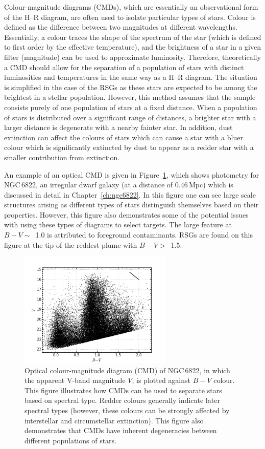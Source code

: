 Colour-magnitude diagrams (CMDs), which are essentially an observational form of the H--R diagram, are often used to isolate particular types of stars.
Colour is defined as the difference between two magnitudes at different wavelengths.
Essentially, a colour traces the shape of the spectrum of the star (which is defined to first order by the effective temperature), and the brightness of a star in a given filter (magnitude) can be used to approximate luminosity.
Therefore, theoretically a CMD should allow for the separation of a population of stars with distinct luminosities and temperatures in the same way as a H--R diagram.
The situation is simplified in the case of the RSGs as these stars are expected to be among the brightest in a stellar population.
However, this method assumes that the sample consists purely of one population of stars at a fixed distance.
When a population of stars is distributed over a significant range of distances, a brighter star with a larger distance is degenerate with a nearby fainter star.
In addition, dust extinction can affect the colours of stars which can cause a star with a bluer colour which is significantly extincted by dust to appear as a redder star with a smaller contribution from extinction.

An example of an optical CMD is given in Figure~\ref{fig:CMD},
which shows photometry for NGC\,6822, an irregular dwarf galaxy
(at a distance of 0.46\,Mpc) which is discussed in detail in Chapter~\ref{ch:ngc6822}.
In this figure one can see large scale structures arising as different types of stars distinguish themselves based on their properties.
However, this figure also demonstrates some of the potential issues with using these types of diagrams to select targets.
The large feature at $B-V \sim$~1.0 is attributed to foreground contaminants.
RSGs are found on this figure at the tip of the reddest plume with $B-V >$~1.5.

\begin{figure}
 \centering
 \includegraphics[width=0.65\textwidth]{intro/NGC6822_bv_CMD}
 \caption[Optical colour-magnitude diagram of NGC\,6822]{Optical colour-magnitude diagram (CMD) of NGC\,6822, in which the apparent V-band magnitude $V$, is plotted against $B-V$ colour.
This figure illustrates how CMDs can be used to separate stars based on spectral type. Redder colours generally indicate later spectral types (however, these colours can be strongly affected by interstellar and circumstellar extinction).
This figure also demonstrates that CMDs have inherent degeneracies between different populations of stars.
 \label{fig:CMD}}
\end{figure}

